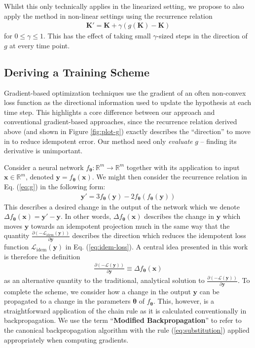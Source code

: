 \documentclass{article}
\theoremstyle{plain}
\theoremstyle{definition}
\theoremstyle{remark}
\newcommand{\vx}{\mathbf{x}}
\newcommand{\vy}{\mathbf{y}}
\newcommand{\vK}{\mathbf{K}}
\newcommand{\vtheta}{\bm{\theta}}
\newcommand{\pd}[2]{\frac{\partial{#1}}{\partial{#2}}}
\begin{document}
Whilst this only technically applies in the linearized setting, we propose to also apply the method in non-linear settings using the recurrence relation
%
\begin{align}
    \vK' = \vK + \gamma(g(\vK) - \vK)
\end{align}
%
for $0 \leq \gamma \leq 1$. This has the effect of taking small $\gamma$-sized steps in the direction of $g$ at every time point.

\subsection{Deriving a Training Scheme}
\label{sec:method-scheme}
Gradient-based optimization techniques use the gradient of an often non-convex loss function as the directional information used to update the hypothesis at each time step. This highlights a core difference between our approach and conventional gradient-based approaches, since the recurrence relation derived above (and shown in Figure \ref{fig:plot-g}) exactly describes the ``direction'' to move in to reduce idempotent error. Our method need only \textit{evaluate} $g$ -- finding its derivative is unimportant.

Consider a neural network ${f_{\vtheta}: \mathbb{R}^m \to \mathbb{R}^m}$ together with its application to input ${\vx \in \mathbb{R}^m}$, denoted ${\vy = f_{\vtheta}(\vx)}$. We might then consider the recurrence relation in Eq. (\ref{eq:g}) in the following form:
%
\begin{align}
    \vy' = 3f_{\vtheta}(\vy) - 2f_{\vtheta}(f_{\vtheta}(\vy))
\end{align}
%
This describes a desired change in the output of the network which we denote ${\Delta f_{\vtheta}(\vx) = \vy' - \vy}$. In other words, ${\Delta f_{\vtheta}(\vx)}$ describes the change in $\vy$ which moves $\vy$ towards an idempotent projection much in the same way that the quantity $\pd{(-\mathcal{L}_{\mathrm{idem}}(\vy))}{\vy}$ describes the direction which reduces the idempotent loss function $\mathcal{L}_{\mathrm{idem}}(\vy)$ in Eq. (\ref{eq:idem-loss}). A central idea presented in this work is therefore the definition
%
\begin{align}
    \pd{(-\mathcal{L}(\vy))}{\vy} \equiv \Delta f_{\vtheta}(\vx)
    \label{eq:substitution}
\end{align}
%
as an alternative quantity to the traditional, analytical solution to $\pd{(-\mathcal{L}(\vy))}{\vy}$. To complete the scheme, we consider how a change in the output $\vy$ can be propagated to a change in the parameters $\vtheta$ of $f_{\vtheta}$. This, however, is a straightforward application of the chain rule as it is calculated conventionally in backpropagation. We use the term ``\textbf{Modified Backpropagation}'' to refer to the canonical backpropagation algorithm with the rule (\ref{eq:substitution}) applied appropriately when computing gradients.
\end{document}
